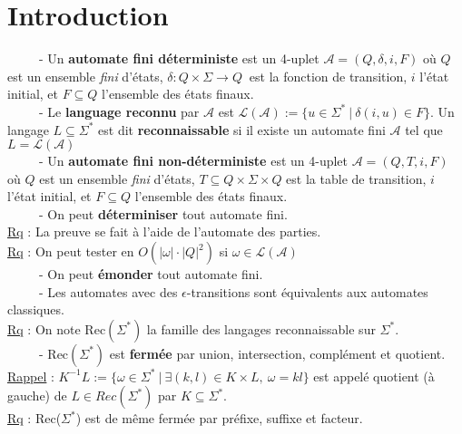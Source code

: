 \documentclass[11pt,a4paper]{article}
\begin{document}
\section{Introduction}
\ \ \ \ \ - Un \textbf{automate fini déterministe} est un 4-uplet $\mathcal{A} = (Q,\delta, i, F)$ où $Q$ est un ensemble \textit{fini} d'états, $\delta : Q \times \Sigma \to Q \ $ est la fonction de transition, $i$ l'état initial, et $F \subseteq Q$ l'ensemble des états finaux. \\

\ \ \ \ \ - Le \textbf{language reconnu} par $\mathcal{A}$ est $\mathcal{L}(\mathcal{A}) := \{u \in \Sigma^* \ | \ \delta(i,u) \in F\}$. Un langage $L \subseteq \Sigma^*$ est dit \textbf{reconnaissable} si il existe un automate fini $\mathcal{A}$ tel que $L = \mathcal{L}(\mathcal{A})$\\

\ \ \ \ \ - Un \textbf{automate fini non-déterministe} est un 4-uplet $\mathcal{A} = (Q,T, i, F)$ où $Q$ est un ensemble \textit{fini} d'états, $ T \subseteq Q \times \Sigma	\times Q$ est la table de transition, $i$ l'état initial, et $F \subseteq Q$ l'ensemble des états finaux. \\

\ \ \ \ \ - On peut \textbf{déterminiser} tout automate fini. \\

\underline{Rq} : La preuve se fait à l'aide de l'automate des parties. \\
\underline{Rq} : On peut tester en $O(|\omega|\cdot|Q|^2)$ si $\omega \in \mathcal{L}(\mathcal{A})$\\

\ \ \ \ \ - On peut \textbf{émonder} tout automate fini. \\

\ \ \ \ \ - Les automates avec des $\epsilon$-transitions sont équivalents aux automates classiques.  \\

\underline{Rq} : On note Rec$(\Sigma^*)$ la famille des langages reconnaissable sur $\Sigma^*$. \\

\ \ \ \ \ - Rec$(\Sigma^*)$ est \textbf{fermée} par union, intersection, complément et quotient. \\

\underline{Rappel} : $K^{-1}L := \{\omega \in \Sigma^*\ | \ \exists (k,l) \in K\times L, \ \omega =kl \}$ est appelé quotient (à gauche) de $L \in Rec(\Sigma^*)$ par $K \subseteq \Sigma^*$.  \\
\underline{Rq} : Rec($\Sigma^*$) est de même fermée par préfixe, suffixe et facteur. \\
\end{document}
